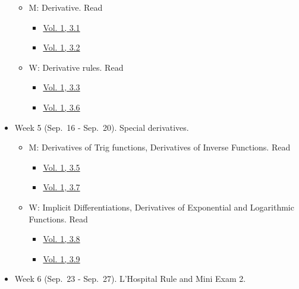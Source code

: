 \documentclass[
]{article}
\providecommand{\tightlist}{%
  \setlength{\itemsep}{0pt}\setlength{\parskip}{0pt}}
\begin{document}
\begin{itemize}
  \begin{itemize}
  \tightlist
  \item
    M: Derivative. Read

    \begin{itemize}
    \tightlist
    \item
      \href{https://openstax.org/books/calculus-volume-1/pages/3-1-defining-the-derivative}{Vol. 1, 3.1}
    \item
      \href{https://openstax.org/books/calculus-volume-1/pages/3-2-the-derivative-as-a-function}{Vol. 1, 3.2}
    \end{itemize}
  \item
    W: Derivative rules. Read

    \begin{itemize}
    \tightlist
    \item
      \href{https://openstax.org/books/calculus-volume-1/pages/3-3-differentiation-rules}{Vol. 1, 3.3}
    \item
      \href{https://openstax.org/books/calculus-volume-1/pages/3-6-the-chain-rule}{Vol. 1, 3.6}
    \end{itemize}
  \end{itemize}
\item
  Week 5 (Sep.~16 - Sep.~20). Special derivatives.

  \begin{itemize}
  \tightlist
  \item
    M: Derivatives of Trig functions, Derivatives of Inverse Functions. Read

    \begin{itemize}
    \tightlist
    \item
      \href{https://openstax.org/books/calculus-volume-1/pages/3-5-derivatives-of-trigonometric-functions}{Vol. 1, 3.5}
    \item
      \href{https://openstax.org/books/calculus-volume-1/pages/3-7-derivatives-of-inverse-functions}{Vol. 1, 3.7}
    \end{itemize}
  \item
    W: Implicit Differentiations, Derivatives of Exponential and Logarithmic Functions. Read

    \begin{itemize}
    \tightlist
    \item
      \href{https://openstax.org/books/calculus-volume-1/pages/3-8-implicit-differentiation}{Vol. 1, 3.8}
    \item
      \href{https://openstax.org/books/calculus-volume-1/pages/3-9-derivatives-of-exponential-and-logarithmic-functions}{Vol. 1, 3.9}
    \end{itemize}
  \end{itemize}
\item
  Week 6 (Sep.~23 - Sep.~27). L'Hospital Rule and Mini Exam 2.


\end{itemize}
\end{document}
